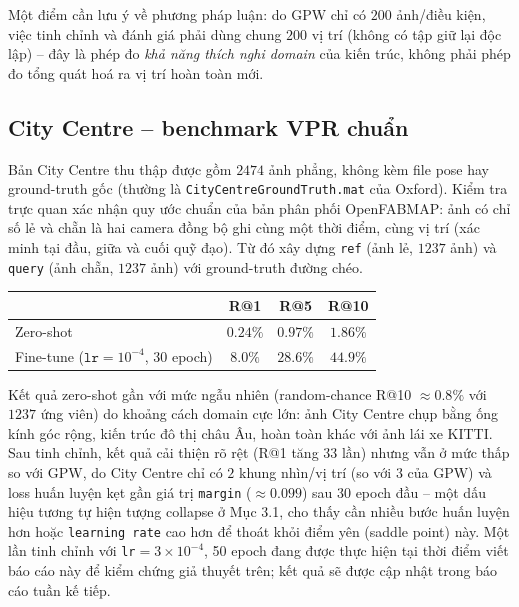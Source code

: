 \documentclass[a4paper,12pt]{article}
\begin{document}
Một điểm cần lưu ý về phương pháp luận: do GPW chỉ có $200$ ảnh/điều kiện, việc tinh chỉnh và đánh giá phải dùng chung $200$ vị trí (không có tập giữ lại độc lập) -- đây là phép đo \emph{khả năng thích nghi domain} của kiến trúc, không phải phép đo tổng quát hoá ra vị trí hoàn toàn mới.

\subsection{City Centre -- benchmark VPR chuẩn}
Bản City Centre thu thập được gồm $2474$ ảnh phẳng, không kèm file pose hay ground-truth gốc (thường là \texttt{CityCentreGroundTruth.mat} của Oxford). Kiểm tra trực quan xác nhận quy ước chuẩn của bản phân phối OpenFABMAP: ảnh có chỉ số lẻ và chẵn là hai camera đồng bộ ghi cùng một thời điểm, cùng vị trí (xác minh tại đầu, giữa và cuối quỹ đạo). Từ đó xây dựng \texttt{ref} (ảnh lẻ, $1237$ ảnh) và \texttt{query} (ảnh chẵn, $1237$ ảnh) với ground-truth đường chéo.
\begin{center}
\begin{tabular}{lccc}
\toprule
& R@1 & R@5 & R@10 \\
\midrule
Zero-shot & $0.24\%$ & $0.97\%$ & $1.86\%$ \\
Fine-tune ($\texttt{lr}=10^{-4}$, 30 epoch) & $8.0\%$ & $28.6\%$ & $44.9\%$ \\
\bottomrule
\end{tabular}
\end{center}
Kết quả zero-shot gần với mức ngẫu nhiên (random-chance R@10 $\approx 0.8\%$ với $1237$ ứng viên) do khoảng cách domain cực lớn: ảnh City Centre chụp bằng ống kính góc rộng, kiến trúc đô thị châu Âu, hoàn toàn khác với ảnh lái xe KITTI. Sau tinh chỉnh, kết quả cải thiện rõ rệt (R@1 tăng $33$ lần) nhưng vẫn ở mức thấp so với GPW, do City Centre chỉ có $2$ khung nhìn/vị trí (so với $3$ của GPW) và loss huấn luyện kẹt gần giá trị \texttt{margin} ($\approx 0.099$) sau 30 epoch đầu -- một dấu hiệu tương tự hiện tượng collapse ở Mục 3.1, cho thấy cần nhiều bước huấn luyện hơn hoặc \texttt{learning rate} cao hơn để thoát khỏi điểm yên (saddle point) này. Một lần tinh chỉnh với \texttt{lr}$=3\times10^{-4}$, 50 epoch đang được thực hiện tại thời điểm viết báo cáo này để kiểm chứng giả thuyết trên; kết quả sẽ được cập nhật trong báo cáo tuần kế tiếp.
\end{document}
